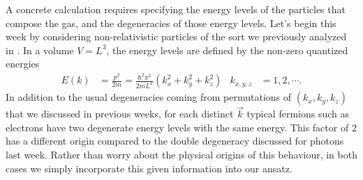 A concrete calculation requires specifying the energy levels of the particles that compose the gas, and the degeneracies of those energy levels.
Let's begin this week by considering non-relativistic particles of the sort we previously analyzed in .
In a volume $V = L^3$, the energy levels are defined by the non-zero quantized energies
\begin{align*}
  E(k) & = \frac{p^2}{2m} = \frac{\hbar^2 \pi^2}{2mL^2}\left(k_x^2 + k_y^2 + k_z^2\right) &
  k_{x, y, z} & = 1, 2, \cdots.
\end{align*}
In addition to the usual degeneracies coming from permutations of $(k_x, k_y, k_z)$ that we discussed in previous weeks, for each distinct $\vec k$ typical fermions such as electrons have two degenerate energy levels with the same energy.
This factor of $2$ has a different origin compared to the double degeneracy discussed for photons last week.
Rather than worry about the physical origins of this behaviour, in both cases we simply incorporate this given information into our ansatz. %

